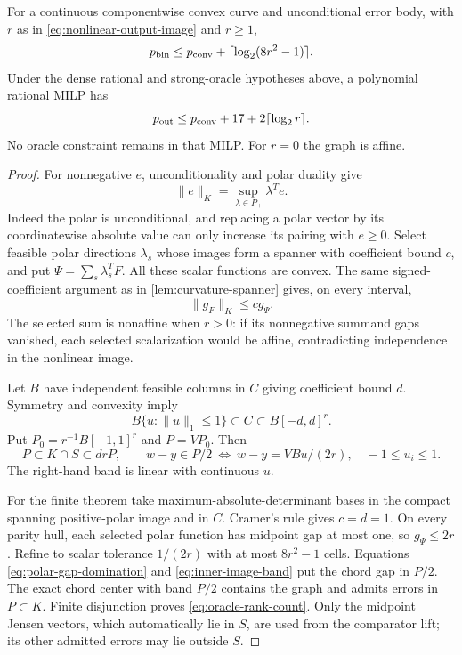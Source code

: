\begin{theorem}\label{thm:vector-oracle-rank}
For a continuous componentwise convex curve and unconditional error body,
with $r$ as in \eqref{eq:nonlinear-output-image} and $r\ge1$,
\begin{equation}\label{eq:oracle-rank-count}
 p_{\mathrm{bin}}\le p_{\mathrm{conv}}+\lceil\log_2(8r^2-1)\rceil.
\end{equation}
Under the dense rational and strong-oracle hypotheses above, a polynomial
rational MILP has
\begin{equation}\label{eq:oracle-rank-compiled}
 p_{\mathrm{out}}\le p_{\mathrm{conv}}+17+2\lceil\log_2r\rceil.
\end{equation}
No oracle constraint remains in that MILP. For $r=0$ the graph is affine.
\end{theorem}
\begin{proof}
For nonnegative $e$, unconditionality and polar duality give
\[
 \|e\|_K=\sup_{\lambda\in P_+}\lambda^Te.
\]
Indeed the polar is unconditional, and replacing a polar vector by
its coordinatewise absolute value can only increase its pairing with
$e\ge0$. Select feasible polar directions $\lambda_s$ whose images
form a spanner with coefficient bound $c$, and put
$\Psi=\sum_s\lambda_s^TF$. All these scalar functions are convex.
The same signed-coefficient argument as in \cref{lem:curvature-spanner}
gives, on every interval,
\begin{equation}\label{eq:polar-gap-domination}
 \|g_F\|_K\le c g_\Psi.
\end{equation}
The selected sum is nonaffine when $r>0$: if its nonnegative summand
gaps vanished, each selected scalarization would be affine, contradicting
independence in the nonlinear image.

Let $B$ have independent feasible columns in $C$ giving coefficient
bound $d$. Symmetry and convexity imply
\[
 B\{u:\|u\|_1\le1\}\subset C\subset B[-d,d]^r.
\]
Put $P_0=r^{-1}B[-1,1]^r$ and $P=VP_0$. Then
\begin{equation}\label{eq:inner-image-band}
 P\subset K\cap S\subset drP,
 \qquad w-y\in P/2
 \ \Longleftrightarrow\ w-y=VBu/(2r),\quad -1\le u_i\le1.
\end{equation}
The right-hand band is linear with continuous $u$.

For the finite theorem take maximum-absolute-determinant bases in the
compact spanning positive-polar image and in $C$. Cramer's rule gives
$c=d=1$. On every parity hull, each selected polar function has midpoint
gap at most one, so $g_\Psi\le2r$. Refine to scalar tolerance
$1/(2r)$ with at most $8r^2-1$ cells. Equations
\eqref{eq:polar-gap-domination} and \eqref{eq:inner-image-band} put
the chord gap in $P/2$. The exact chord center with band $P/2$ contains
the graph and admits errors in $P\subset K$. Finite disjunction proves
\eqref{eq:oracle-rank-count}. Only the midpoint Jensen vectors, which
automatically lie in $S$, are used from the comparator lift; its other
admitted errors may lie outside $S$.


\end{proof}
